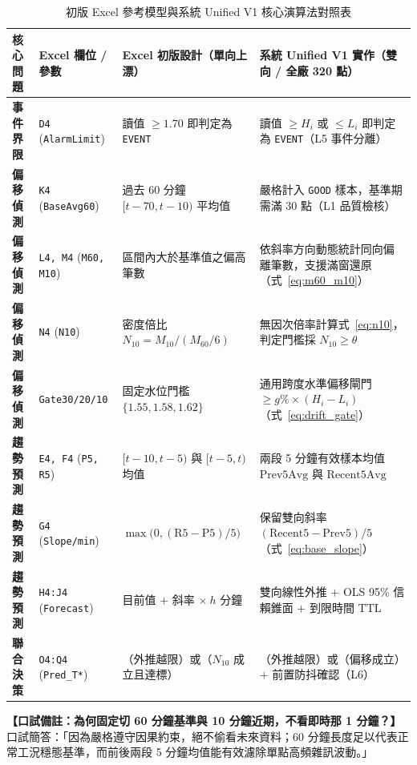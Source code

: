 \documentclass[fontset=none, a4paper, 12pt]{ctexart}
\begin{document}
\begin{doublespace}
\begin{table}[H]
\centering
\caption{初版 Excel 參考模型與系統 Unified V1 核心演算法對照表}
\label{tab:excel_to_program_map}
\scriptsize
\renewcommand{\arraystretch}{1.2}
\setlength{\tabcolsep}{3.5pt}
\begin{tabularx}{\textwidth}{>{\bfseries}l l X X}
\toprule
核心問題 & Excel 欄位 / 參數 & Excel 初版設計（單向上漂） & 系統 Unified V1 實作（雙向 / 全廠 320 點） \\
\midrule
事件界限 & \texttt{D4} (\texttt{AlarmLimit}) & 讀值 $\ge 1.70$ 即判定為 \texttt{EVENT} & 讀值 $\ge H_i$ 或 $\le L_i$ 即判定為 \texttt{EVENT}（L5 事件分離） \\
偏移偵測 & \texttt{K4} (\texttt{BaseAvg60}) & 過去 60 分鐘 $[t-70,t-10)$ 平均值 & 嚴格計入 \texttt{GOOD} 樣本，基準期需滿 30 點（L1 品質檢核） \\
偏移偵測 & \texttt{L4, M4} (\texttt{M60, M10}) & 區間內大於基準值之偏高筆數 & 依斜率方向動態統計同向偏離筆數，支援滿窗還原（式~\eqref{eq:m60_m10}） \\
偏移偵測 & \texttt{N4} (\texttt{N10}) & 密度倍比 $N_{10} = M_{10}/(M_{60}/6)$ & 無因次倍率計算式~\eqref{eq:n10}，判定門檻採 $N_{10} \ge \theta$ \\
偏移偵測 & \texttt{Gate30/20/10} & 固定水位門檻 $\{1.55, 1.58, 1.62\}$ & 通用跨度水準偏移閘門 $\ge g\%\times(H_i-L_i)$（式~\eqref{eq:drift_gate}） \\
趨勢預測 & \texttt{E4, F4} (\texttt{P5, R5}) & $[t-10,t-5)$ 與 $[t-5,t)$ 均值 & 兩段 5 分鐘有效樣本均值 $\mathrm{Prev5Avg}$ 與 $\mathrm{Recent5Avg}$ \\
趨勢預測 & \texttt{G4} (\texttt{Slope/min}) & $\max\bigl(0, (\mathrm{R5}-\mathrm{P5})/5\bigr)$ & 保留雙向斜率 $(\mathrm{Recent5}-\mathrm{Prev5})/5$（式~\eqref{eq:base_slope}） \\
趨勢預測 & \texttt{H4:J4} (\texttt{Forecast}) & 目前值 $+$ 斜率 $\times\ h$ 分鐘 & 雙向線性外推 $+$ OLS 95\% 信賴錐面 $+$ 到限時間 $\mathrm{TTL}$ \\
聯合決策 & \texttt{O4:Q4} (\texttt{Pred\_T*}) & （外推越限）或（$N_{10}$ 成立且達標） & （外推越限）或（偏移成立）$+$ 前置防抖確認（L6） \\
\bottomrule
\end{tabularx}
\end{table}

\noindent\textbf{【口試備註：為何固定切 60 分鐘基準與 10 分鐘近期，不看即時那 1 分鐘？】}\\
口試簡答：「因為嚴格遵守因果約束，絕不偷看未來資料；60 分鐘長度足以代表正常工況穩態基準，而前後兩段 5 分鐘均值能有效濾除單點高頻雜訊波動。」


\end{doublespace}
\end{document}
